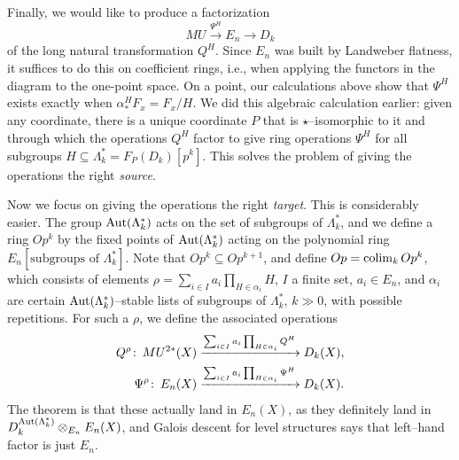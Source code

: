 Finally, we would like to produce a factorization \[MU \xrightarrow{\Psi^H} E_n \to D_k\] of the long natural transformation $Q^H$.  Since $E_n$ was built by Landweber flatness, it suffices to do this on coefficient rings, i.e., when applying the functors in the diagram to the one-point space.  On a point, our calculations above show that $\Psi^H$ exists exactly when $\alpha^H_* F_x = F_x / H$.  We did this algebraic calculation earlier: given any coordinate, there is a unique coordinate $P$ that is $\star$--isomorphic to it and through which the operations $Q^H$ factor to give ring operations $\Psi^H$ for all subgroups $H \subseteq \Lambda_k^* = F_P(D_k)[p^k]$.  This solves the problem of giving the operations the right \emph{source}.


Now we focus on giving the operations the right \emph{target}.  This is considerably easier.  The group $\operatorname{Aut}(\Lambda_k^*)$ acts on the set of subgroups of $\Lambda_k^*$, and we define a ring $Op^k$ by the fixed points of $\operatorname{Aut}(\Lambda_k^*)$ acting on the polynomial ring $E_n[\text{subgroups of $\Lambda_k^*$}]$.  Note that $Op^k \subseteq Op^{k+1}$, and define $Op = \operatorname*{colim}_k Op^k$, which consists of elements $\rho = \sum_{i \in I} a_i \prod_{H \in \alpha_i} H$, $I$ a finite set, $a_i \in E_n$, and $\alpha_i$ are certain $\operatorname{Aut}(\Lambda_k^*)$--stable lists of subgroups of $\Lambda_k^*$, $k \gg 0$, with possible repetitions.  For such a $\rho$, we define the associated operations
\begin{align*}
Q^\rho \colon\thinspace MU^{2*}(X) & \xrightarrow{\sum_{i \in I} a_i \prod_{H \in \alpha_i} Q^H} D_k(X), \\
\Psi^\rho \colon\thinspace E_n(X) & \xrightarrow{\sum_{i \in I} a_i \prod_{H \in \alpha_i} \Psi^H} D_k(X).
\end{align*}
The theorem is that these actually land in $E_n(X)$, as they definitely land in $D_k^{\operatorname{Aut}(\Lambda_k^*)} \otimes_{E_n} E_n(X)$, and Galois descent for level structures says that left--hand factor is just $E_n$.

